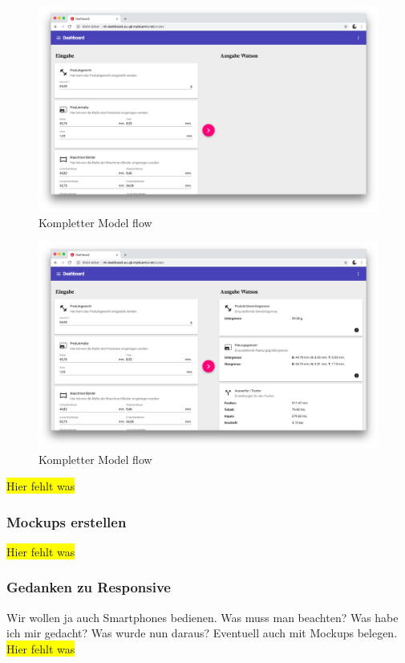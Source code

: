 \begin{figure}[h]
    \centering
    \includegraphics[width=\textwidth]{images/kapitel_4/website_input.png}
    \caption{Kompletter Model flow}
    \label{fig:umsetzung_website_input}
\end{figure}

\begin{figure}[h]
    \centering
    \includegraphics[width=\textwidth]{images/kapitel_4/website_output.png}
    \caption{Kompletter Model flow}
    \label{fig:umsetzung_website_output}
\end{figure}

\colorbox{yellow}{Hier fehlt was}

\subsubsection{Mockups erstellen}
\colorbox{yellow}{Hier fehlt was}

\subsubsection{Gedanken zu Responsive}
Wir wollen ja auch Smartphones bedienen. Was muss man beachten? Was habe ich mir gedacht? Was wurde nun daraus?
Eventuell auch mit Mockups belegen.
\colorbox{yellow}{Hier fehlt was}

